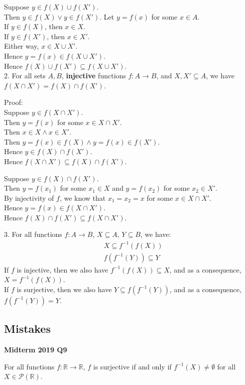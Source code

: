 \documentclass{article}
\begin{document}
Suppose $y\in f(X)\cup f(X')$. \\Then $y\in f(X)\lor y\in f(X')$. Let $y=f(x)$ for some $x\in A$.\\
If $y\in f(X)$, then $x\in X$.\\
If $y\in f(X')$, then $x\in X'$. \\Either way, $x\in X\cup X'$. \\Hence $y=f(x)\in f(X\cup X')$. \\Hence $f(X)\cup f(X')\subseteq f(X\cup X')$.\\


2. For all sets $A,B$, \textbf{injective} functions $f: A\rightarrow B$, and $X,X'\subseteq A$, we have $f(X\cap X')=f(X)\cap f(X')$.

Proof: \\
Suppose $y\in f(X\cap X')$. \\Then $y=f(x)$ for some $x\in X\cap X'$. \\Then $x\in X\land x\in X'$.\\
Then $y=f(x)\in f(X)\land y=f(x)\in f(X')$.\\
Hence $y\in f(X)\cap f(X')$.\\
Hence $f(X\cap X')\subseteq f(X)\cap f(X')$.

Suppose $y\in f(X)\cap f(X')$. \\Then $y=f(x_1)$ for some $x_1\in X$ and $y=f(x_2)$ for some $x_2\in X'$.\\ By injectivity of $f$, we know that $x_1=x_2=x$ for some $x\in X\cap X'$.\\
Hence $y=f(x)\in f(X\cap X')$.\\
Hence $f(X)\cap f(X')\subseteq f(X\cap X')$.

3. For all functions $f:A\rightarrow B$, $X\subseteq A,\, Y\subseteq B$, we have:
\begin{align*}
    &X\subseteq f^{-1}(f(X))\\
    &f(f^{-1}(Y))\subseteq Y
\end{align*}
If $f$ is injective, then we also have $f^{-1}(f(X))\subseteq X$, and as a consequence, $X = f^{-1}(f(X))$.\\
If $f$ is surjective, then we also have $Y\subseteq f(f^{-1}(Y))$, and as a consequence, $f(f^{-1}(Y)) = Y$.

\subsection{Mistakes}
\textbf{Midterm 2019 Q9}

For all functions $f: \mathbb{R}\rightarrow \mathbb{R}$, $f$ is surjective if and only if $f^{-1}(X)\neq \emptyset$ for all $X\in \mathcal{P}(\mathbb{R})$.
\end{document}
